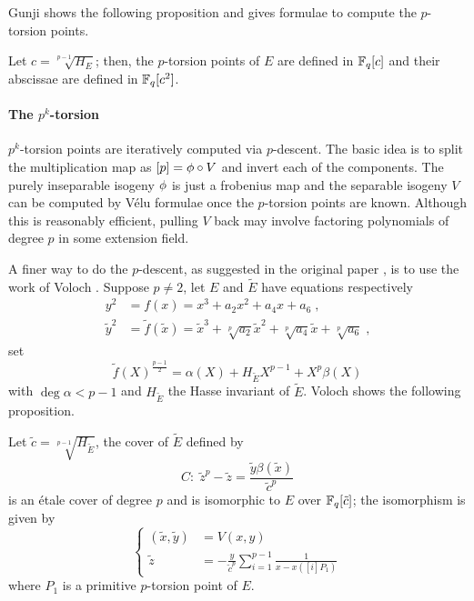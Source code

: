 Gunji shows the following proposition and gives formulae to compute
the $p$-torsion points.

\begin{proposition}
  \label{th:gunji}
  Let $c=\sqrt[p-1]{H_E}$; then, the $p$-torsion points of $E$ are
  defined in $\mathbb{F}_q[c]$ and their abscissae are defined in $\mathbb{F}_q[c^2]$.
\end{proposition}


\paragraph{The $p^k$-torsion}
$p^k$-torsion points are iteratively computed via $p$-descent. The
basic idea is to split the multiplication map as $[p] = \phi\circ
V$ and invert each of the components. The purely inseparable isogeny
$\phi$ is just a frobenius map and the separable isogeny $V$ can
be computed by Vélu formulae once the $p$-torsion points are
known. Although this is reasonably efficient, pulling $V$ back may
involve factoring polynomials of degree $p$ in some extension field.

A finer way to do the $p$-descent, as suggested in the original paper
\cite{Cou96}, is to use the work of Voloch \cite{Vol90}. Suppose
$p\ne2$, let $E$ and $\widetilde{E}$ have equations respectively
\begin{align*}
  y^2&=f(x)=x^3+a_2x^2+a_4x+a_6 \;\text{,}\\
  \tilde{y}^2&=\tilde{f}(\tilde{x}) = \tilde{x}^3 +
  \sqrt[p]{a_2}\tilde{x}^2 + \sqrt[p]{a_4}\tilde{x} + \sqrt[p]{a_6}
  \;\text{,}
\end{align*}
set
 \begin{equation}
  \label{eq:voloch:cover}
  \tilde{f}(X)^{\frac{p-1}{2}} = \alpha(X) + H_{\widetilde{E}}X^{p-1} + X^p\beta(X)
\end{equation}
with $\deg \alpha < p-1$ and $H_{\widetilde{E}}$ the Hasse invariant
of $\widetilde{E}$. Voloch shows the following proposition.

\begin{proposition}
  \label{th:voloch}
  Let $\tilde{c} = \sqrt[p-1]{H_{\widetilde{E}}}$, the cover of
  $\widetilde{E}$ defined by
  \begin{equation}
    \label{th:voloch:cover}
    C:\; \tilde{z}^p - \tilde{z} = \frac{\tilde{y}\beta(\tilde{x})}{\tilde{c}^p}
  \end{equation}
  is an étale cover of degree $p$ and is isomorphic to $E$ over
  $\mathbb{F}_q[\tilde{c}]$; the isomorphism is given by
  \begin{equation}
    \label{th:voloch:isom}
    \left\{
      \begin{aligned}
        (\tilde{x}, \tilde{y}) &= V(x, y)\\
        \tilde{z} &= -\frac{y}{\tilde{c}^p}\sum_{i=1}^{p-1}\frac{1}{x - x([i]P_1)}
      \end{aligned}
    \right.
  \end{equation}
  where $P_1$ is a primitive $p$-torsion point of $E$.
\end{proposition}

